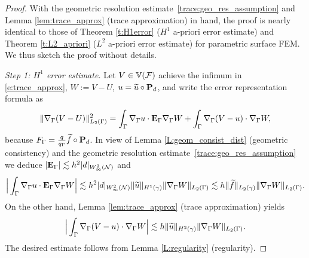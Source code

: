 \begin{proof}
With the geometric resolution estimate~\eqref{trace:geo_res_assumption} and Lemma \ref{lem:trace_approx} (trace approximation) in hand, the proof is nearly identical to those of Theorem \ref{t:H1error} ($H^1$ a-priori error estimate) and Theorem \ref{t:L2_apriori} ($L^2$ a-priori error estimate) for parametric surface FEM. We thus sketch the proof without details.

\medskip\noindent
{\it Step 1: $H^1$ error estimate.}
Let $V \in\mathbb{V}(\mathcal F)$ achieve the infimum in \eqref{e:trace_approx}, $W:=V-U$, $u=\widetilde{u}\circ{\bf P}_d$, and write the error representation formula as
%
\[
\|\nabla_\Gamma (V-U)\|_{L_2(\Gamma)}^2 = \int_\Gamma \nabla_\Gamma u\cdot{\bf E}_\Gamma \nabla_\Gamma W + \int_\Gamma \nabla_\Gamma (V-u)\cdot\nabla_\Gamma W,
\]
%
because $F_\Gamma = \frac{q}{q_\Gamma} \widetilde{f} \circ {\bf P}_d$.
In view of Lemma \ref{L:geom_consist_dist} (geometric consistency) and the geometric resolution estimate~\eqref{trace:geo_res_assumption} we deduce $|{\bf E}_\Gamma| \lesssim h^2 |d|_{W^2_\infty(\mathcal{N})}$ and
%
\[
\Big| \int_\Gamma \nabla_\Gamma u\cdot{\bf E}_\Gamma \nabla_\Gamma W  \Big|
\lesssim h^2 |d|_{W^2_\infty(\mathcal{N})} \|\widetilde{u}\|_{H^1(\gamma)} \|\nabla_\Gamma W\|_{L_2(\Gamma)} \lesssim h \|\widetilde f\|_{L_2(\gamma)} \|\nabla_\Gamma W\|_{L_2(\Gamma)}.
\]
%
On the other hand, Lemma \ref{lem:trace_approx} (trace approximation) yields
%
\[
\Big|  \int_\Gamma \nabla_\Gamma (V-u)\cdot\nabla_\Gamma W \Big|
\lesssim h \|\widetilde{u}\|_{H^2(\gamma)} \|\nabla_\Gamma W\|_{L_2(\Gamma)}.
\]
%  
The desired estimate follows from Lemma \ref{L:regularity} (regularity).


\end{proof}
